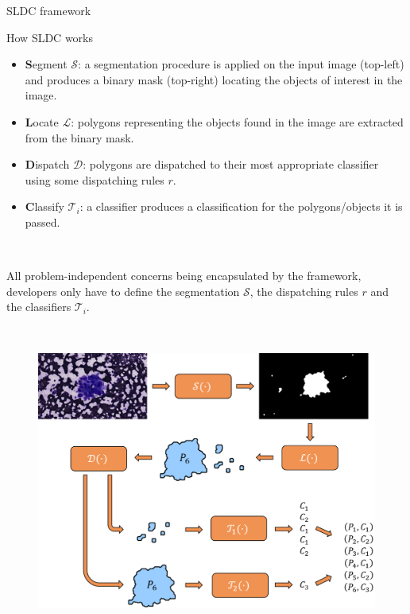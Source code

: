 \documentclass{beamer}
\begin{document}
\begin{frame}
\begin{columns}[t]
\begin{block} {SLDC framework}
\begin{alertblock}{How SLDC works}
~

\begin{itemize}
\item \textbf{S}egment $\mathcal{S}$: a segmentation procedure is applied on the input image (top-left) and produces a binary mask (top-right) locating the objects of interest in the image.
\item \textbf{L}ocate $\mathcal{L}$: polygons representing the objects found in the image are extracted from the binary mask.
\item \textbf{D}ispatch $\mathcal{D}$: polygons are dispatched to their most appropriate classifier using some dispatching rules $r$. 
\item \textbf{C}lassify $\mathcal{T}_i$: a classifier produces a classification for the polygons/objects it is passed.
\end{itemize}

~

All problem-independent concerns being encapsulated by the framework, developers only have to define the segmentation $\mathcal{S}$, the dispatching rules $r$ and the classifiers $\mathcal{T}_i$.

~

\begin{figure}
\center
\includegraphics[scale=1.3]{images/workflow_illustration.png}
\end{figure}

\end{alertblock}
\end{block}

\column{.45\paperwidth}


\end{columns}
\end{frame}
\end{document}
